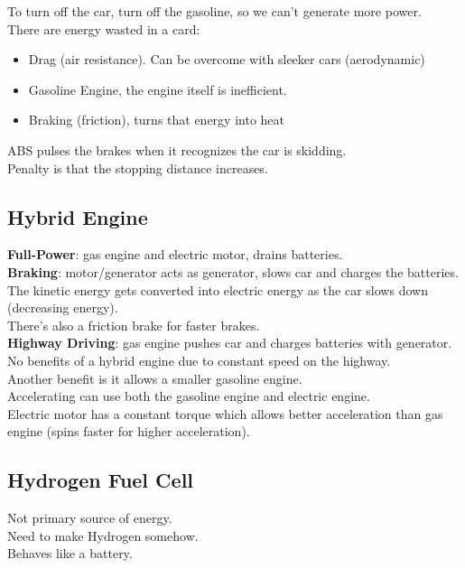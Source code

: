 \documentclass[12pt]{article}
\theoremstyle{definition}
\begin{document}
To turn off the car, turn off the gasoline, so we can't generate more power. \\

There are energy wasted in a card:
\begin{itemize}
  \item Drag (air resistance). Can be overcome with sleeker cars (aerodynamic)
  \item Gasoline Engine, the engine itself is inefficient.
  \item Braking (friction), turns that energy into heat
\end{itemize}

ABS pulses the brakes when it recognizes the car is skidding. \\
Penalty is that the stopping distance increases.

\subsection{Hybrid Engine}
\textbf{Full-Power}: gas engine and electric motor, drains batteries. \\

\textbf{Braking}: motor/generator acts as generator, slows car and charges the batteries. \\
The kinetic energy gets converted into electric energy as the car slows down (decreasing energy). \\
There's also a friction brake for faster brakes. \\

\textbf{Highway Driving}: gas engine pushes car and charges batteries with generator. \\
No benefits of a hybrid engine due to constant speed on the highway. \\

Another benefit is it allows a smaller gasoline engine. \\
Accelerating can use both the gasoline engine and electric engine. \\

Electric motor has a constant torque which allows better acceleration than gas engine (spins faster for higher acceleration).

\subsection{Hydrogen Fuel Cell}
Not primary source of energy. \\
Need to make Hydrogen somehow. \\
Behaves like a battery. \\
\end{document}
